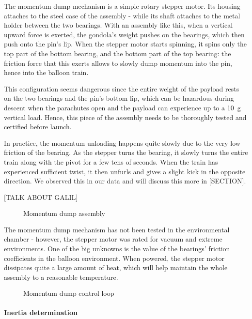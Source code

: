 The momentum dump mechanism is a simple rotary stepper motor. Its housing attaches to the steel case of the assembly - while its shaft attaches to the metal holder between the two bearings. With an assembly like this, when a vertical upward force is exerted, the gondola's weight pushes on the bearings, which then push onto the pin's lip. When the stepper motor starts spinning, it spins only the top part of the bottom bearing, and the bottom part of the top bearing: the friction force that this exerts allows to slowly dump momentum into the pin, hence into the balloon train. 

This configuration seems dangerous since the entire weight of the payload rests on the two bearings and the pin's bottom lip, which can be hazardous during descent when the parachutes open and the payload can experience up to a 10~g vertical load. Hence, this piece of the assembly needs to be thoroughly tested and certified before launch. 

In practice, the momentum unloading happens quite slowly due to the very low friction of the bearing. As the stepper turns the bearing, it slowly turns the entire train along with the pivot for a few tens of seconds. When the train has experienced sufficient twist, it then unfurls and gives a slight kick in the opposite direction. We observed this in our data and will discuss this more in [SECTION].

[TALK ABOUT GALIL]
\begin{figure}[!ht]
	\centering
	
	\caption[Momentum dump assembly]{Momentum dump assembly}
	\label{fig:rotator}
    \end{figure}

The momentum dump mechanism has not been tested in the environmental chamber - however, the stepper motor was rated for vacuum and extreme environments. One of the big unknowns is the value of the bearings' friction coefficients in the balloon environment. When powered, the stepper motor dissipates quite a large amount of heat, which will help maintain the whole assembly to a reasonable temperature. 

\begin{figure}[!ht]
	\centering
	
	\caption[Momentum dump PID]{Momentum dump control loop}
	\label{fig:MomDumpPID}
    \end{figure}


\paragraph{Inertia determination}

